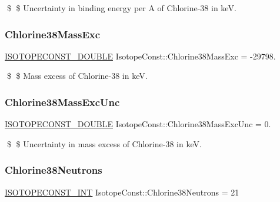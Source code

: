 \$ \$ Uncertainty in binding energy per A of Chlorine-\/38 in keV. \mbox{\label{group___isotope_const-_chlorine-_cl38_ga354cdfddb57d8a9095fd3b25994b74e7}} 
\subsubsection{\texorpdfstring{Chlorine38\+Mass\+Exc}{Chlorine38MassExc}}
{\footnotesize\ttfamily \mbox{\hyperlink{group___isotope_const-_macros_ga8f45a7272ce02c0b4c65c44636ed719a}{I\+S\+O\+T\+O\+P\+E\+C\+O\+N\+S\+T\+\_\+\+D\+O\+U\+B\+LE}} Isotope\+Const\+::\+Chlorine38\+Mass\+Exc = -\/29798.}

\$ \$ Mass excess of Chlorine-\/38 in keV. \mbox{\label{group___isotope_const-_chlorine-_cl38_gacf5129ea30dccfde98b2835409866f39}} 
\subsubsection{\texorpdfstring{Chlorine38\+Mass\+Exc\+Unc}{Chlorine38MassExcUnc}}
{\footnotesize\ttfamily \mbox{\hyperlink{group___isotope_const-_macros_ga8f45a7272ce02c0b4c65c44636ed719a}{I\+S\+O\+T\+O\+P\+E\+C\+O\+N\+S\+T\+\_\+\+D\+O\+U\+B\+LE}} Isotope\+Const\+::\+Chlorine38\+Mass\+Exc\+Unc = 0.}

\$ \$ Uncertainty in mass excess of Chlorine-\/38 in keV. \mbox{\label{group___isotope_const-_chlorine-_cl38_ga9e25cf3dd8fffe4f0739d4a27b179063}} 
\subsubsection{\texorpdfstring{Chlorine38\+Neutrons}{Chlorine38Neutrons}}
{\footnotesize\ttfamily \mbox{\hyperlink{group___isotope_const-_macros_ga5f18360b3e99483a35c32d789e62621c}{I\+S\+O\+T\+O\+P\+E\+C\+O\+N\+S\+T\+\_\+\+I\+NT}} Isotope\+Const\+::\+Chlorine38\+Neutrons = 21}

